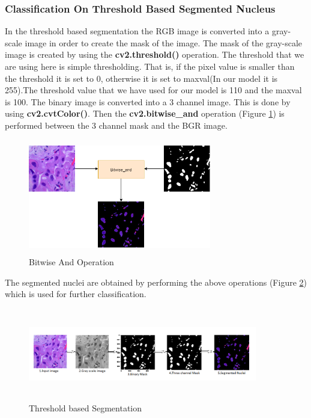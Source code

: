 \documentclass[conference]{IEEEtran}
\begin{document}
\subsubsection{Classification On Threshold Based Segmented Nucleus}
In the threshold based segmentation the RGB image is converted into a gray-scale image in order to create the mask of the image. The mask of the gray-scale image is created by using the {\bf cv2.threshold()} operation. The threshold that we are using here is simple thresholding. That is, if the pixel value is smaller than the threshold it is set to 0, otherwise it is set to maxval(In our model it is 255).The threshold value that we have used for our model is 110 and the maxval is 100. The binary image is converted into a 3 channel image. This is done by using {\bf cv2.cvtColor()}. Then the {\bf cv2.bitwise\_and} operation (Figure \ref{result}) is performed between the 3 channel mask and the BGR image.
\begin{figure}[htbp]
\centerline{\includegraphics[width=8cm, height=5cm]{./figures/result.png}}
\caption{Bitwise And Operation}
\label{result}
\end{figure}
The segmented nuclei are obtained by performing the above operations (Figure \ref{threseg}) which is used for further classification.
\newline
\begin{figure}[htbp]
\centerline{\includegraphics[width=10cm, height=4cm]{./figures/threseg.png}}
\caption{Threshold based Segmentation}
\label{threseg}
\end{figure}
\end{document}
